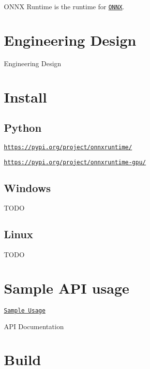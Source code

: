 O\+N\+NX Runtime is the runtime for \href{https://github.com/onnx/onnx}{\tt O\+N\+NX}.

\section*{Engineering Design}

Engineering Design

\section*{Install}

\subsection*{Python}


\begin{DoxyItemize}
\item \href{https://pypi.org/project/onnxruntime/}{\tt https\+://pypi.\+org/project/onnxruntime/}
\item \href{https://pypi.org/project/onnxruntime-gpu/}{\tt https\+://pypi.\+org/project/onnxruntime-\/gpu/}
\end{DoxyItemize}

\subsection*{Windows}

T\+O\+DO

\subsection*{Linux}

T\+O\+DO

\section*{Sample A\+PI usage}


\begin{DoxyItemize}
\item \href{onnxruntime/test/shared_lib/fns_candy_style_transfer.c}{\tt Sample Usage}
\item A\+PI Documentation
\end{DoxyItemize}

\section*{Build}

